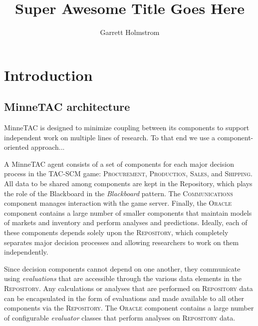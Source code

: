 \documentclass{elsart}
\begin{document}
\title{Super Awesome Title Goes Here}
\author[UMN]{Garrett Holmstrom}

\address[UMN]{Dept. of Computer Science and Engineering,
    University of Minnesota, 4-192 EE/CS Bldg., 200 Union St SE, Minneapolis,
    MN 55455, USA.}

\maketitle

\begin{abstract}

\end{abstract}

\section{Introduction}


\subsection{MinneTAC architecture}

MinneTAC is designed to minimize coupling between its components to support independent work on multiple lines of research.  To that end we use a component-oriented approach...

A MinneTAC agent consists of a set of components for each major decision
process in the TAC-SCM game: \textsc{Procurement}, \textsc{Production},
\textsc{Sales}, and \textsc{Shipping}.  All data to be shared
among components are kept in the Repository, which plays the role
of the Blackboard in the \emph{Blackboard} pattern\cite{Busch96}.
The \textsc{Communications} component manages interaction with the game
server.  Finally, the \textsc{Oracle} component contains a large number
of smaller components that maintain models of markets and inventory and
perform analyses and predictions.  Ideally, each of these components
depends solely upon the \textsc{Repository}, which completely separates
major decision processes and allowing researchers to work on them
independently.


Since decision components cannot depend on one another, they communicate
using \emph{evaluations} that are accessible through the various data
elements in the \textsc{Repository}.  Any calculations or analyses that
are performed on \textsc{Repository} data can be encapsulated in the
form of evaluations and made available to all other components via the
\textsc{Repository}.  The \textsc{Oracle} component contains a large
number of configurable \emph{evaluator} classes that perform analyses
on \textsc{Repository} data.
\end{document}
